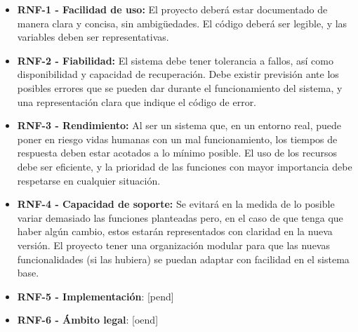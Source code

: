 \begin{itemize}
    \item \textbf{RNF-1 - Facilidad de uso:} El proyecto deberá estar documentado de manera clara y concisa, sin ambigüedades. El código deberá ser legible, y las variables deben ser representativas.
    \item \textbf{RNF-2 - Fiabilidad:} El sistema debe tener tolerancia a fallos, así como disponibilidad y capacidad de recuperación. Debe existir previsión ante los posibles errores que se pueden dar durante el funcionamiento del sistema, y una representación clara que indique el código de error.
    \item \textbf{RNF-3 - Rendimiento:} Al ser un sistema que, en un entorno real, puede poner en riesgo vidas humanas con un mal funcionamiento, los tiempos de respuesta deben estar acotados a lo mínimo posible. El uso de los recursos debe ser eficiente, y la prioridad de las funciones con mayor importancia debe respetarse en cualquier situación.
    \item \textbf{RNF-4 - Capacidad de soporte:} Se evitará en la medida de lo posible variar demasiado las funciones planteadas pero, en el caso de que tenga que haber algún cambio, estos estarán representados con claridad en la nueva versión. El proyecto tener una organización modular para que las nuevas funcionalidades (si las hubiera) se puedan adaptar con facilidad en el sistema base. 
    \item \textbf{RNF-5 - Implementación}: [pend]
    \item \textbf{RNF-6 - Ámbito legal}: [oend]
\end{itemize}

